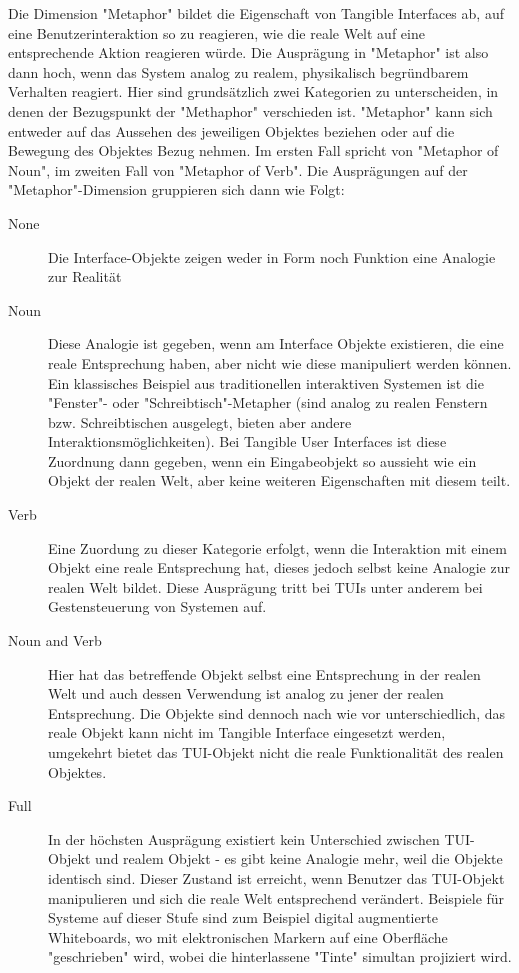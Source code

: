 Die Dimension "Metaphor" bildet die Eigenschaft von Tangible Interfaces ab, auf eine Benutzerinteraktion so zu reagieren, wie die reale Welt auf eine entsprechende Aktion reagieren würde. Die Ausprägung in "Metaphor" ist also dann hoch, wenn das System analog zu realem, physikalisch begründbarem Verhalten reagiert. Hier sind grundsätzlich zwei Kategorien zu unterscheiden, in denen der Bezugspunkt der "Methaphor" verschieden ist. "Metaphor" kann sich entweder auf das Aussehen des jeweiligen Objektes beziehen oder auf die Bewegung des Objektes Bezug nehmen. Im ersten Fall spricht \citeauthor{Fishkin04} von "Metaphor of Noun", im zweiten Fall von "Metaphor of Verb". Die Ausprägungen auf der "Metaphor"-Dimension gruppieren sich dann wie Folgt:
\begin{description}
 \item[None] Die Interface-Objekte zeigen weder in Form noch Funktion eine Analogie zur Realität
 \item[Noun] Diese Analogie ist gegeben, wenn am Interface Objekte existieren, die eine reale Entsprechung haben, aber nicht wie diese manipuliert werden können. Ein klassisches Beispiel aus traditionellen interaktiven Systemen ist die "Fenster"- oder "Schreibtisch"-Metapher (sind analog zu realen Fenstern bzw. Schreibtischen ausgelegt, bieten aber andere Interaktionsmöglichkeiten). Bei Tangible User Interfaces ist diese Zuordnung dann gegeben, wenn ein Eingabeobjekt so aussieht wie ein Objekt der realen Welt, aber keine weiteren Eigenschaften mit diesem teilt.
 \item[Verb] Eine Zuordung zu dieser Kategorie erfolgt, wenn die Interaktion mit einem Objekt eine reale Entsprechung hat, dieses jedoch selbst keine Analogie zur realen Welt bildet. Diese Ausprägung tritt bei \glspl{TUI} unter anderem bei Gestensteuerung von Systemen auf.
 \item[Noun and Verb] Hier hat das betreffende Objekt selbst eine Entsprechung in der realen Welt und auch dessen Verwendung ist analog zu jener der realen Entsprechung. Die Objekte sind dennoch nach wie vor unterschiedlich, das reale Objekt kann nicht im Tangible Interface eingesetzt werden, umgekehrt bietet das \gls{TUI}-Objekt nicht die reale Funktionalität des realen Objektes. 
 \item[Full] In der höchsten Ausprägung existiert kein Unterschied zwischen \gls{TUI}-Objekt und realem Objekt - es gibt keine Analogie mehr, weil die Objekte identisch sind. Dieser Zustand ist erreicht, wenn Benutzer das TUI-Objekt manipulieren und sich die reale Welt entsprechend verändert. Beispiele für Systeme auf dieser Stufe sind zum Beispiel digital augmentierte Whiteboards, wo mit elektronischen Markern auf eine Oberfläche "geschrieben" wird, wobei die hinterlassene "Tinte" simultan projiziert wird.
\end{description}

